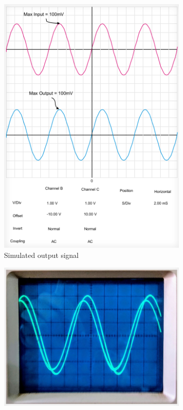 \documentclass[12pt]{article}
\begin{document}
\begin{figure}[h!]
    \centering
    \begin{subfigure}{0.45\textwidth}
        \includegraphics[width=\linewidth]{CC_sim.png}
        \caption{Simulated output signal}
        \label{fig:CC sim}
    \end{subfigure}
    \begin{subfigure}{0.45\textwidth}
        \includegraphics[width=\linewidth]{CC_prac.png}

\end{subfigure}
\end{figure}
\end{document}
